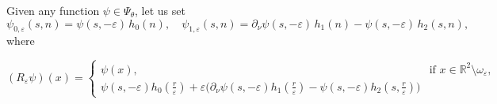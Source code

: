 \documentclass[reqno]{amsart}
\theoremstyle{plain}
\numberwithin{equation}{section}
\newcommand{\Real}{\mathbb R}
\newcommand{\eps}{\varepsilon}
\begin{document}
Given any function $\psi\in\Psi_\theta$, let us set
\begin{equation*}
  \psi_{0,\eps}(s,n)=\psi(s,-\eps)\,h_0(n), \quad
  \psi_{1,\eps}(s,n)=\partial_\nu\psi(s,-\eps)\,h_1(n)
     -\psi(s,-\eps)\,h_2(s,n),
\end{equation*}
where





\begin{equation*}
  (R_\eps\psi)(x)=
  \begin{cases}
    \psi(x), & \text{if } x\in \Real^2\setminus \omega_\eps,\\
     \psi(s,-\eps)h_0(\tfrac{r}{\eps})
     +\eps\big(\partial_\nu\psi(s,-\eps)h_1(\tfrac{r}{\eps})
     -\psi(s,-\eps)h_2(s,\tfrac{r}{\eps})\big)
  \end{cases}
\end{equation*}
\end{document}
